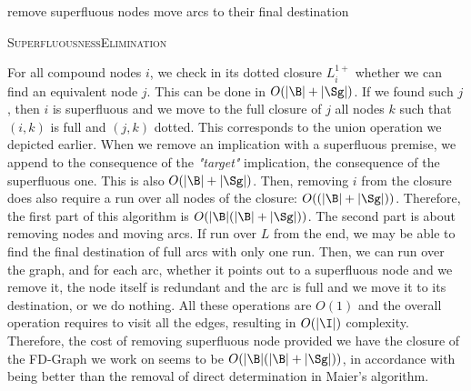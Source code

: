 \begin{algorithm}
	
	\BlankLine
	\BlankLine
	
	
	remove superfluous nodes \;
	move arcs to their final destination \;	
	
	\caption{\textsc{SuperfluousnessElimination}}
	\label{alg:Ausiello-Superfluous}
\end{algorithm}

For all compound nodes $i$, we check in its dotted closure $L_{i}^{1+}$ whether 
we can find an equivalent node $j$. This can be done in $O(|\B| + |\Sg|)$. If we found such $j$, then $i$ is superfluous and we move to the full closure of $j$ all nodes $k$ such that $(i, k)$ is full and $(j, k)$ dotted. This corresponds to the union operation we depicted earlier. When we remove an implication with a superfluous premise, we append to the consequence of the \textit{"target"} implication, the consequence of the superfluous one. This is also $O(|\B| + |\Sg|)$. Then, removing $i$ from the closure does also require a run over all nodes of the closure: $O((|\B| + |\Sg|))$. Therefore, the first part of this algorithm is $O(|\B|(|\B| + |\Sg|))$. The second part is about removing nodes and moving arcs. If run over $L$ from the end, we may be able to find the final destination of full arcs with only one run. Then, we can run over the graph, and for each arc, whether it points out to a superfluous node and we remove it, the node itself is redundant and the arc is full and we move it to its destination, or we do nothing. All these operations are $O(1)$ and the overall operation requires to visit all the edges, resulting in $O(|\I|)$ complexity. Therefore, the cost of removing superfluous node provided we have the closure of the FD-Graph we work on seems to be $O(|\B|(|\B| + |\Sg|))$, in
accordance with \cite{ausiello_graph_1983, ausiello_minimal_1986} being better than the removal of direct determination in Maier's algorithm.

\vspace{1.2em}

